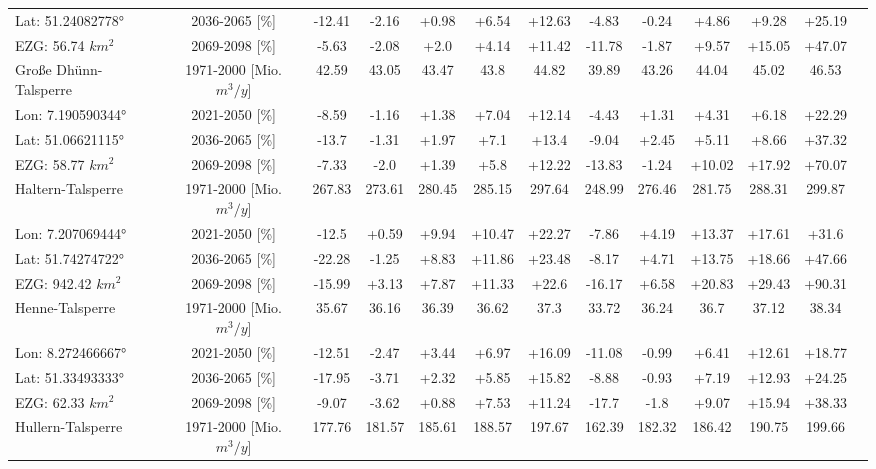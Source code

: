 \begin{longtable}{@{\extracolsep{\fill}}lc|ccccc||cccccc}
Lat: 51.24082778° & 2036-2065 [\%]  & -12.41 & -2.16 & +0.98 & +6.54 & +12.63 & -4.83 & -0.24 & +4.86 & +9.28 & +25.19 & \\ 
EZG: 56.74 $km^2$ & 2069-2098 [\%]  & -5.63 & -2.08 & +2.0 & +4.14 & +11.42 & -11.78 & -1.87 & +9.57 & +15.05 & +47.07 & \\ 
\hline 
Große Dhünn-Talsperre & 1971-2000 [Mio. $m^3/y$]  & 42.59 & 43.05 & 43.47 & 43.8 & 44.82 & 39.89 & 43.26 & 44.04 & 45.02 & 46.53 & \\ 
\cline{2-13} 
Lon: 7.190590344° & 2021-2050 [\%]  & -8.59 & -1.16 & +1.38 & +7.04 & +12.14 & -4.43 & +1.31 & +4.31 & +6.18 & +22.29 & \\ 
Lat: 51.06621115° & 2036-2065 [\%]  & -13.7 & -1.31 & +1.97 & +7.1 & +13.4 & -9.04 & +2.45 & +5.11 & +8.66 & +37.32 & \\ 
EZG: 58.77 $km^2$ & 2069-2098 [\%]  & -7.33 & -2.0 & +1.39 & +5.8 & +12.22 & -13.83 & -1.24 & +10.02 & +17.92 & +70.07 & \\ 
\hline 
Haltern-Talsperre & 1971-2000 [Mio. $m^3/y$]  & 267.83 & 273.61 & 280.45 & 285.15 & 297.64 & 248.99 & 276.46 & 281.75 & 288.31 & 299.87 & \\ 
\cline{2-13} 
Lon: 7.207069444° & 2021-2050 [\%]  & -12.5 & +0.59 & +9.94 & +10.47 & +22.27 & -7.86 & +4.19 & +13.37 & +17.61 & +31.6 & \\ 
Lat: 51.74274722° & 2036-2065 [\%]  & -22.28 & -1.25 & +8.83 & +11.86 & +23.48 & -8.17 & +4.71 & +13.75 & +18.66 & +47.66 & \\ 
EZG: 942.42 $km^2$ & 2069-2098 [\%]  & -15.99 & +3.13 & +7.87 & +11.33 & +22.6 & -16.17 & +6.58 & +20.83 & +29.43 & +90.31 & \\ 
\hline 
Henne-Talsperre & 1971-2000 [Mio. $m^3/y$]  & 35.67 & 36.16 & 36.39 & 36.62 & 37.3 & 33.72 & 36.24 & 36.7 & 37.12 & 38.34 & \\ 
\cline{2-13} 
Lon: 8.272466667° & 2021-2050 [\%]  & -12.51 & -2.47 & +3.44 & +6.97 & +16.09 & -11.08 & -0.99 & +6.41 & +12.61 & +18.77 & \\ 
Lat: 51.33493333° & 2036-2065 [\%]  & -17.95 & -3.71 & +2.32 & +5.85 & +15.82 & -8.88 & -0.93 & +7.19 & +12.93 & +24.25 & \\ 
EZG: 62.33 $km^2$ & 2069-2098 [\%]  & -9.07 & -3.62 & +0.88 & +7.53 & +11.24 & -17.7 & -1.8 & +9.07 & +15.94 & +38.33 & \\ 
\hline 
Hullern-Talsperre & 1971-2000 [Mio. $m^3/y$]  & 177.76 & 181.57 & 185.61 & 188.57 & 197.67 & 162.39 & 182.32 & 186.42 & 190.75 & 199.66 & \\ 

\end{longtable}
